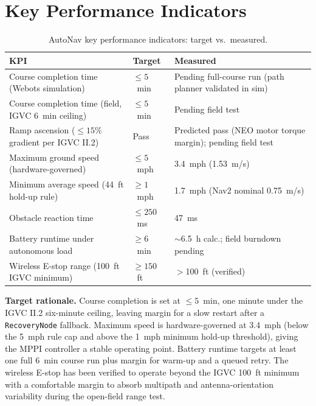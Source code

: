 \documentclass[12pt, letterpaper]{article}
\begin{document}
\section{Key Performance Indicators}
\label{sec:kpi}

\begin{table}[H]
    \centering
    \small
    \caption{AutoNav key performance indicators: target vs.\ measured.}
    \label{tab:kpis}
    \begin{tabularx}{\textwidth}{X l l}
        \toprule
        \textbf{KPI} & \textbf{Target} & \textbf{Measured} \\
        \midrule
        Course completion time (Webots simulation)         & $\leq 5$~min   & Pending full-course run (path planner validated in sim) \\
        Course completion time (field, IGVC 6~min ceiling) & $\leq 5$~min   & Pending field test \\
        Ramp ascension ($\leq 15\%$ gradient per IGVC II.2)  & Pass           & Predicted pass (NEO motor torque margin); pending field test \\
        Maximum ground speed (hardware-governed)           & $\leq 5$~mph   & 3.4~mph (1.53~m/s) \\
        Minimum average speed (44~ft hold-up rule)         & $\geq 1$~mph   & 1.7~mph (Nav2 nominal 0.75~m/s) \\
        Obstacle reaction time                             & $\leq 250$~ms  & 47~ms \\
        Battery runtime under autonomous load              & $\geq 6$~min   & $\sim$6.5~h calc.; field burndown pending \\
        Wireless E-stop range (100~ft IGVC minimum)        & $\geq 150$~ft  & $>$100~ft (verified) \\
        \bottomrule
    \end{tabularx}
\end{table}

\textbf{Target rationale.} Course completion is set at $\leq 5$~min, one minute under
the IGVC II.2 six-minute ceiling, leaving margin for a slow restart after a
\texttt{RecoveryNode} fallback. Maximum speed is hardware-governed at 3.4~mph
(below the 5~mph rule cap and above the 1~mph minimum hold-up threshold), giving the
MPPI controller a stable operating point. Battery runtime targets at least one full
6~min course run plus margin for warm-up and a queued retry. The wireless E-stop has
been verified to operate beyond the IGVC 100~ft minimum with a comfortable margin to
absorb multipath and antenna-orientation variability during the open-field range test.
\end{document}
